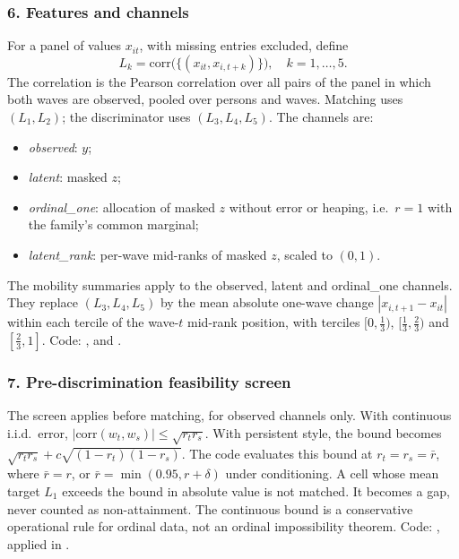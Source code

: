 \subsubsection*{6. Features and channels}
For a panel of values $x_{it}$, with missing entries excluded, define
\begin{equation*}
L_k=\mathrm{corr}\bigl(\{(x_{it},x_{i,t+k})\}\bigr),\quad k=1,\ldots,5.
\end{equation*}
The correlation is the Pearson correlation over all pairs of the panel in which both waves are observed, pooled over persons and waves. Matching uses $(L_1,L_2)$; the discriminator uses $(L_3,L_4,L_5)$. The channels are:
\begin{itemize}
\item \emph{observed}: $y$;
\item \emph{latent}: masked $z$;
\item \emph{ordinal\_one}: allocation of masked $z$ without error or heaping, i.e.\ $r=1$ with the family's common marginal;
\item \emph{latent\_rank}: per-wave mid-ranks of masked $z$, scaled to $(0,1)$.
\end{itemize}
The mobility summaries apply to the observed, latent and ordinal\_one channels. They replace $(L_3,L_4,L_5)$ by the mean absolute one-wave change $|x_{i,t+1}-x_{it}|$ within each tercile of the wave-$t$ mid-rank position, with terciles $[0,\tfrac13)$, $[\tfrac13,\tfrac23)$ and $[\tfrac23,1]$. Code: ,  and .

\subsubsection*{7. Pre-discrimination feasibility screen}
The screen applies before matching, for observed channels only. With continuous i.i.d.\ error, $|\mathrm{corr}(w_t,w_s)|\le\sqrt{r_tr_s}$. With persistent style, the bound becomes $\sqrt{r_tr_s}+c\sqrt{(1-r_t)(1-r_s)}$. The code evaluates this bound at $r_t=r_s=\bar r$, where $\bar r=r$, or $\bar r=\min(0.95,r+\delta)$ under conditioning. A cell whose mean target $L_1$ exceeds the bound in absolute value is not matched. It becomes a gap, never counted as non-attainment. The continuous bound is a conservative operational rule for ordinal data, not an ordinal impossibility theorem. Code: , applied in .

